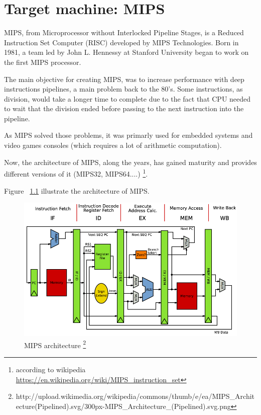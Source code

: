\documentclass[
  oneside,
  11pt, a4paper,
  footinclude=true,
  headinclude=true,
  cleardoublepage=empty
]{scrbook}
\begin{document}
\chapter{Target machine: MIPS}


MIPS, from Microprocessor without Interlocked Pipeline Stages, is a Reduced Instruction Set Computer (RISC) developed by MIPS Technologies. 
Born in 1981, a team led by John L. Hennessy at Stanford University began to work on the first MIPS processor.

The main objective for creating MIPS, was to increase performance with deep instructions pipelines, a main problem back to the 80's. 
Some instructions, as division, would take a longer time to complete due to the fact that CPU needed to wait that the division ended before passing to the next instruction into the pipeline.

As MIPS solved those problems, it was primarly used for embedded systems and video games consoles (which requires a lot of arithmetic computation). 

Now, the architecture of MIPS, along the years, has gained maturity and provides different versions of it (MIPS32, MIPS64....) \footnote{according to wikipedia \url{https://en.wikipedia.org/wiki/MIPS_instruction_set}}.

Figure ~\ref{fig:MIPSarchitecture} illustrate the architecture of MIPS.


\begin{figure}[h!]
  \centering
    \includegraphics[width=1\textwidth]{img/MIPSarchitecture.png}
    \caption{MIPS architecture \protect\footnote{http://upload.wikimedia.org/wikipedia/commons/thumb/e/ea/MIPS\_Architecture(Pipelined).svg/300px-MIPS\_Architecture\_(Pipelined).svg.png}}
    \label{fig:MIPSarchitecture}
\end{figure}
\end{document}
